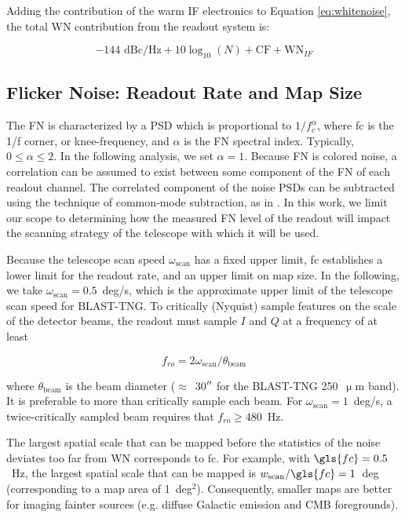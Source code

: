 Adding the contribution of the warm IF electronics to Equation \ref{eq:whitenoise}, the total WN contribution from the readout system is:

\begin{equation}\label{eq:readout_noise}
  -144 \textrm{ dBc/Hz} + 10\log_{10}(N) + \mathrm{CF} + \textrm{WN}_{IF}
\end{equation}

\subsection{Flicker Noise: Readout Rate and Map Size}\label{flicker noise}

The FN is characterized by a PSD which is proportional to $1/f_{c}^{\alpha}$, where \gls{fc} is the 1/f corner, or knee-frequency, and $\alpha$ is the FN spectral index. Typically, $0 \leq \alpha \leq 2$. In the following analysis, we set $\alpha = 1$. Because FN is colored noise, a correlation can be assumed to exist between some component of the FN of each readout channel. The correlated component of the noise PSDs can be subtracted using the technique of common-mode subtraction, as in \citet{van2016multiplexed}. In this work, we limit our scope to determining how the measured FN level of the readout will impact the scanning strategy of the telescope with which it will be used.

Because the telescope scan speed $\omega_{\mathrm{scan}}$ has a fixed upper limit, \gls{fc} establishes a lower limit for the readout rate, and an upper limit on map size. In the following, we take $\omega_{\mathrm{scan}} = 0.5$~deg/s, which is the approximate upper limit of the telescope scan speed for BLAST-TNG. To critically (Nyquist) sample features on the scale of the detector beams, the readout must sample $I$ and $Q$ at a frequency of at least

\begin{equation}\label{eq:readout rate}
  f_{ro} = 2 \omega_{\mathrm{scan}} / \theta_{\mathrm{beam}}
\end{equation}

where $\theta_{\mathrm{beam}}$ is the beam diameter ($\approx$~30$\operatorname{^{\prime\prime}}$ for the BLAST-TNG 250~$\upmu$m band). It is preferable to more than critically sample each beam. For $\omega_{\mathrm{scan}} = 1$~deg/s, a twice-critically sampled beam requires that $f_{ro} \geq 480$~Hz.

The largest spatial scale that can be mapped before the statistics of the noise deviates too far from WN corresponds to \gls{fc}. For example, with $\gls{fc} = 0.5$~Hz, the largest spatial scale that can be mapped is $w_{\mathrm{scan}} / \gls{fc} = 1$~deg (corresponding to a map area of 1~deg$^{2}$). Consequently, smaller maps are better for imaging fainter sources (e.g. diffuse Galactic emission and CMB foregrounds).

